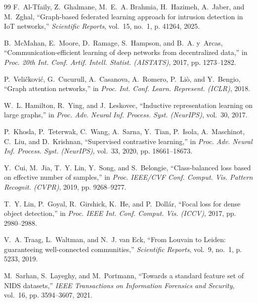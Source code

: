 \documentclass[12pt,a4paper]{report}
\begin{document}
\newpage
\clearpage{}\label{ch:references}
\begin{thebibliography}{99}
F.~Al-Tfaily, Z.~Ghalmane, M.~E.~A. Brahmia, H.~Hazimeh, A.~Jaber, and M.~Zghal, ``Graph-based federated learning approach for intrusion detection in IoT networks,'' \emph{Scientific Reports}, vol.~15, no.~1, p. 41264, 2025.

B.~McMahan, E.~Moore, D.~Ramage, S.~Hampson, and B.~A. y~Arcas, ``Communication-efficient learning of deep networks from decentralized data,'' in \emph{Proc. 20th Int. Conf. Artif. Intell. Statist. (AISTATS)}, 2017, pp. 1273--1282.

P.~Veli{\v{c}}kovi{\'{c}}, G.~Cucurull, A.~Casanova, A.~Romero, P.~Li{\`{o}}, and Y.~Bengio, ``Graph attention networks,'' in \emph{Proc. Int. Conf. Learn. Represent. (ICLR)}, 2018.

W.~L. Hamilton, R.~Ying, and J.~Leskovec, ``Inductive representation learning on large graphs,'' in \emph{Proc. Adv. Neural Inf. Process. Syst. (NeurIPS)}, vol.~30, 2017.

P.~Khosla, P.~Teterwak, C.~Wang, A.~Sarna, Y.~Tian, P.~Isola, A.~Maschinot, C.~Liu, and D.~Krishnan, ``Supervised contrastive learning,'' in \emph{Proc. Adv. Neural Inf. Process. Syst. (NeurIPS)}, vol.~33, 2020, pp. 18661--18673.

Y.~Cui, M.~Jia, T.~Y. Lin, Y.~Song, and S.~Belongie, ``Class-balanced loss based on effective number of samples,'' in \emph{Proc. IEEE/CVF Conf. Comput. Vis. Pattern Recognit. (CVPR)}, 2019, pp. 9268--9277.

T.~Y. Lin, P.~Goyal, R.~Girshick, K.~He, and P.~Doll{\'{a}}r, ``Focal loss for dense object detection,'' in \emph{Proc. IEEE Int. Conf. Comput. Vis. (ICCV)}, 2017, pp. 2980--2988.

V.~A. Traag, L.~Waltman, and N.~J. van Eck, ``From Louvain to Leiden: guaranteeing well-connected communities,'' \emph{Scientific Reports}, vol.~9, no.~1, p. 5233, 2019.

M.~Sarhan, S.~Layeghy, and M.~Portmann, ``Towards a standard feature set of NIDS datasets,'' \emph{IEEE Transactions on Information Forensics and Security}, vol.~16, pp. 3594--3607, 2021.


\end{thebibliography}
\end{document}
